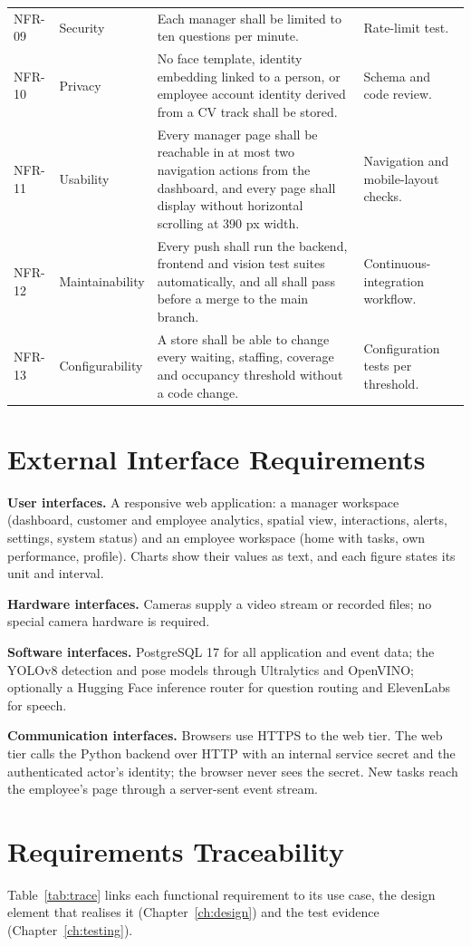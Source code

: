 \begin{longtable}{P{0.095\textwidth}P{0.17\textwidth}P{0.4\textwidth}P{0.24\textwidth}}
NFR-09 & Security & Each manager shall be limited to ten questions per minute. & Rate-limit test.\\
NFR-10 & Privacy & No face template, identity embedding linked to a person, or employee account identity derived from a CV track shall be stored. & Schema and code review.\\
NFR-11 & Usability & Every manager page shall be reachable in at most two navigation actions from the dashboard, and every page shall display without horizontal scrolling at 390 px width. & Navigation and mobile-layout checks.\\
NFR-12 & Maintainability & Every push shall run the backend, frontend and vision test suites automatically, and all shall pass before a merge to the main branch. & Continuous-integration workflow.\\
NFR-13 & Configurability & A store shall be able to change every waiting, staffing, coverage and occupancy threshold without a code change. & Configuration tests per threshold.\\
\end{longtable}

\section{External Interface Requirements}
\textbf{User interfaces.} A responsive web application: a manager workspace (dashboard, customer and employee analytics, spatial view, interactions, alerts, settings, system status) and an employee workspace (home with tasks, own performance, profile). Charts show their values as text, and each figure states its unit and interval.

\textbf{Hardware interfaces.} Cameras supply a video stream or recorded files; no special camera hardware is required.

\textbf{Software interfaces.} PostgreSQL 17 for all application and event data; the YOLOv8 detection and pose models through Ultralytics and OpenVINO; optionally a Hugging Face inference router for question routing and ElevenLabs for speech.

\textbf{Communication interfaces.} Browsers use HTTPS to the web tier. The web tier calls the Python backend over HTTP with an internal service secret and the authenticated actor's identity; the browser never sees the secret. New tasks reach the employee's page through a server-sent event stream.

\section{Requirements Traceability}
Table~\ref{tab:trace} links each functional requirement to its use case, the design element that realises it (Chapter~\ref{ch:design}) and the test evidence (Chapter~\ref{ch:testing}).

